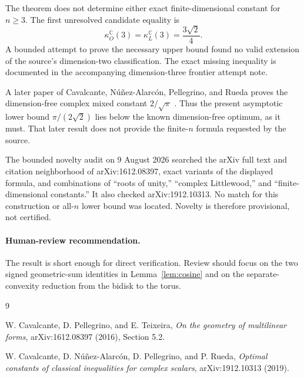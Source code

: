\documentclass[11pt]{article}
\theoremstyle{remark}
\newcommand{\kO}{\kappa_{O}^{\mathbb C}}
\newcommand{\kL}{\kappa_{L}^{\mathbb C}}
\begin{document}
The theorem does not determine either exact finite-dimensional constant for
$n\ge3$. The first unresolved candidate equality is
\[
              \kO(3)=\kL(3)=\frac{3\sqrt2}{4}.
\]
A bounded attempt to prove the necessary upper bound found no valid extension
of the source's dimension-two classification. The exact missing inequality
is documented in the accompanying dimension-three frontier attempt note.

A later paper of Cavalcante, N\'u\~nez-Alarc\'on, Pellegrino, and Rueda proves
the dimension-free complex mixed constant $2/\sqrt\pi$ \cite{CNPR}. Thus the
present asymptotic lower bound $\pi/(2\sqrt2)$ lies below the known
dimension-free optimum, as it must. That later result does not provide the
finite-$n$ formula requested by the source.

The bounded novelty audit on 9 August 2026 searched the arXiv full text and
citation neighborhood of arXiv:1612.08397, exact variants of the displayed
formula, and combinations of ``roots of unity,'' ``complex Littlewood,'' and
``finite-dimensional constants.'' It also checked arXiv:1912.10313. No match
for this construction or all-$n$ lower bound was located. Novelty is therefore
provisional, not certified.

\paragraph{Human-review recommendation.}
The result is short enough for direct verification. Review should focus on
the two signed geometric-sum identities in Lemma~\ref{lem:cosine} and on the
separate-convexity reduction from the bidisk to the torus.

\begin{thebibliography}{9}

W. Cavalcante, D. Pellegrino, and E. Teixeira,
\emph{On the geometry of multilinear forms},
arXiv:1612.08397 (2016), Section 5.2.

W. Cavalcante, D. N\'u\~nez-Alarc\'on, D. Pellegrino, and P. Rueda,
\emph{Optimal constants of classical inequalities for complex scalars},
arXiv:1912.10313 (2019).

\end{thebibliography}
\end{document}
